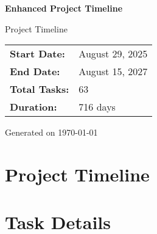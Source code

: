 \documentclass[portrait,a4paper]{article}
\begin{document}
\begin{titlepage}
\centering
\vspace*{2cm}

{\Huge\textbf{Enhanced Project Timeline}}

\vspace{1cm}

{\Large Project Timeline}

\vspace{2cm}

\begin{tabular}{ll}
\textbf{Start Date:} & August 29, 2025 \\
\textbf{End Date:} & August 15, 2027 \\
\textbf{Total Tasks:} & 63 \\
\textbf{Duration:} & 716 days \\
\end{tabular}

\vspace{2cm}

{\large Generated on \today}

\end{titlepage}

\newpage

\section*{Project Timeline}

\begin{center}
\begin{tikzpicture}[scale=0.8]
\end{tikzpicture}
\end{center}

\newpage

\section*{Task Details}
\end{document}
